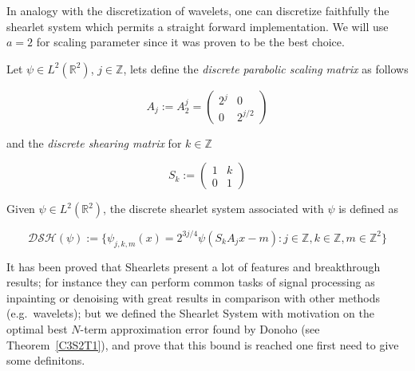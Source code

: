 In analogy with the discretization of wavelets, one can discretize faithfully the shearlet system which permits a straight forward implementation. We will use $a=2$ for scaling parameter since it was proven to be the best choice.

\begin{defn}
Let $\psi\in L^2(\mathbb{R}^2)$, $j\in\mathbb{Z}$, lets define the \textit{discrete parabolic scaling matrix} as follows

\begin{equation}
\label{eq:discscaling}
A_j:= A_2^j =
\left(\begin{matrix}
2^j & 0 \\
0 & 2^{j/2}
\end{matrix}\right)
\end{equation}

and the \textit{discrete shearing matrix} for $k\in\mathbb{Z}$

\begin{equation}
\label{eq:discshearing}
S_k:= 
\left(\begin{matrix}
1 & k \\
0 & 1
\end{matrix}\right) 
\end{equation}

Given $\psi\in L^2(\mathbb{R}^2)$, the discrete shearlet system associated with $\psi$ is defined as

\begin{equation}
\label{eq:discshearletsys}
\mathcal{DSH}(\psi):=\{\psi_{j,k,m}(x)=2^{3j/4}\psi (S_kA_jx-m):j\in\mathbb{Z},k\in\mathbb{Z},m\in\mathbb{Z}^2\}
\end{equation}
\end{defn}

It has been proved that Shearlets present a lot of features and breakthrough results; for instance they can perform common tasks of signal processing as inpainting or denoising with great results in comparison with other methods (e.g.\ wavelets); but we defined the Shearlet System with motivation on the optimal best $N$-term approximation error found by Donoho (see Theorem~\ref{C3S2T1}), and prove that this bound is reached one first need to give some definitons.

